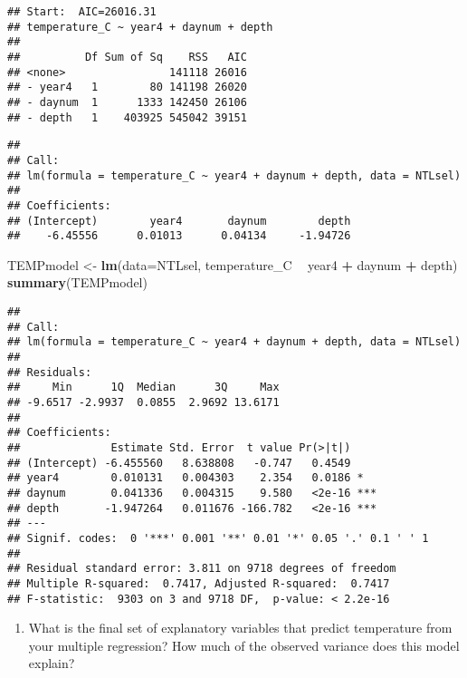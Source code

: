 \documentclass[]{article}
\newenvironment{Shaded}{\begin{snugshade}}{\end{snugshade}}
\newcommand{\KeywordTok}[1]{\textcolor[rgb]{0.13,0.29,0.53}{\textbf{#1}}}
\newcommand{\DataTypeTok}[1]{\textcolor[rgb]{0.13,0.29,0.53}{#1}}
\newcommand{\StringTok}[1]{\textcolor[rgb]{0.31,0.60,0.02}{#1}}
\newcommand{\OperatorTok}[1]{\textcolor[rgb]{0.81,0.36,0.00}{\textbf{#1}}}
\newcommand{\NormalTok}[1]{#1}
\providecommand{\tightlist}{%
  \setlength{\itemsep}{0pt}\setlength{\parskip}{0pt}}
\begin{document}
\begin{verbatim}
## Start:  AIC=26016.31
## temperature_C ~ year4 + daynum + depth
## 
##          Df Sum of Sq    RSS   AIC
## <none>                141118 26016
## - year4   1        80 141198 26020
## - daynum  1      1333 142450 26106
## - depth   1    403925 545042 39151
\end{verbatim}

\begin{verbatim}
## 
## Call:
## lm(formula = temperature_C ~ year4 + daynum + depth, data = NTLsel)
## 
## Coefficients:
## (Intercept)        year4       daynum        depth  
##    -6.45556      0.01013      0.04134     -1.94726
\end{verbatim}

\begin{Shaded}
\begin{Highlighting}[]
\NormalTok{TEMPmodel <-}\StringTok{ }\KeywordTok{lm}\NormalTok{(}\DataTypeTok{data=}\NormalTok{NTLsel, temperature_C }\OperatorTok{~}\StringTok{ }\NormalTok{year4 }\OperatorTok{+}\StringTok{ }\NormalTok{daynum }\OperatorTok{+}\StringTok{ }\NormalTok{depth)}
\KeywordTok{summary}\NormalTok{(TEMPmodel)}
\end{Highlighting}
\end{Shaded}

\begin{verbatim}
## 
## Call:
## lm(formula = temperature_C ~ year4 + daynum + depth, data = NTLsel)
## 
## Residuals:
##     Min      1Q  Median      3Q     Max 
## -9.6517 -2.9937  0.0855  2.9692 13.6171 
## 
## Coefficients:
##              Estimate Std. Error  t value Pr(>|t|)    
## (Intercept) -6.455560   8.638808   -0.747   0.4549    
## year4        0.010131   0.004303    2.354   0.0186 *  
## daynum       0.041336   0.004315    9.580   <2e-16 ***
## depth       -1.947264   0.011676 -166.782   <2e-16 ***
## ---
## Signif. codes:  0 '***' 0.001 '**' 0.01 '*' 0.05 '.' 0.1 ' ' 1
## 
## Residual standard error: 3.811 on 9718 degrees of freedom
## Multiple R-squared:  0.7417, Adjusted R-squared:  0.7417 
## F-statistic:  9303 on 3 and 9718 DF,  p-value: < 2.2e-16
\end{verbatim}

\begin{enumerate}
\def\labelenumi{\arabic{enumi}.}
\setcounter{enumi}{4}
\tightlist
\item
  What is the final set of explanatory variables that predict
  temperature from your multiple regression? How much of the observed
  variance does this model explain?
\end{enumerate}
\end{document}
